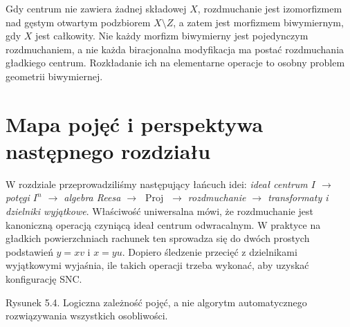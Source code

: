 \begin{uwaga}
Gdy centrum nie zawiera żadnej składowej $X$, rozdmuchanie
jest izomorfizmem nad gęstym otwartym podzbiorem
$X\setminus Z$, a zatem jest morfizmem biwymiernym,
gdy $X$ jest całkowity. Nie każdy morfizm biwymierny
jest pojedynczym rozdmuchaniem, a nie każda
biracjonalna modyfikacja ma postać rozdmuchania
gładkiego centrum. Rozkładanie ich na elementarne
operacje to osobny problem geometrii biwymiernej.
\end{uwaga}

\section{Mapa pojęć i perspektywa następnego rozdziału}
\label{sec:ga5-outlook}

W rozdziale przeprowadziliśmy następujący łańcuch idei:
\emph{ideał centrum $I$ $\longrightarrow$ potęgi $I^n$
$\longrightarrow$ algebra Reesa $\longrightarrow$
$\operatorname{Proj}$ $\longrightarrow$ rozdmuchanie
$\longrightarrow$ transformaty i dzielniki wyjątkowe}.
Właściwość uniwersalna mówi, że rozdmuchanie jest
kanoniczną operacją czyniącą ideał centrum odwracalnym.
W praktyce na gładkich powierzchniach rachunek ten
sprowadza się do dwóch prostych podstawień
$y=xv$ i $x=yu$. Dopiero śledzenie przecięć
z dzielnikami wyjątkowymi wyjaśnia, ile takich operacji
trzeba wykonać, aby uzyskać konfigurację SNC.

\begin{center}
\begin{minipage}{\linewidth}
\centering
{}

{\small Rysunek 5.4. Logiczna zależność pojęć, a nie algorytm automatycznego rozwiązywania wszystkich osobliwości.}\par
\end{minipage}
\end{center}

